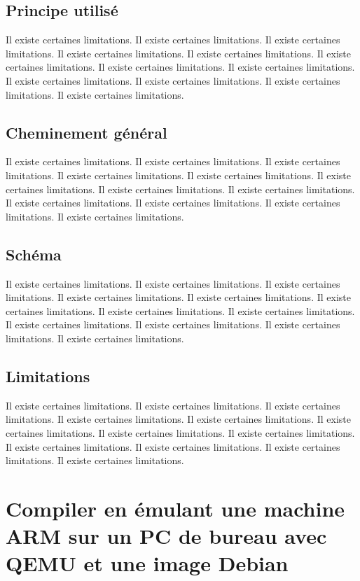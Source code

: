 \documentclass[11pt,a4paper,oneside]{report}
\begin{document}
\subsection{Principe utilisé}

Il existe certaines limitations.
Il existe certaines limitations.
Il existe certaines limitations.
Il existe certaines limitations.
Il existe certaines limitations.
Il existe certaines limitations.
Il existe certaines limitations.
Il existe certaines limitations.
Il existe certaines limitations.
Il existe certaines limitations.
Il existe certaines limitations.
Il existe certaines limitations.
\subsection{Cheminement général}

Il existe certaines limitations.
Il existe certaines limitations.
Il existe certaines limitations.
Il existe certaines limitations.
Il existe certaines limitations.
Il existe certaines limitations.
Il existe certaines limitations.
Il existe certaines limitations.
Il existe certaines limitations.
Il existe certaines limitations.
Il existe certaines limitations.
Il existe certaines limitations.
\subsection{Schéma}

Il existe certaines limitations.
Il existe certaines limitations.
Il existe certaines limitations.
Il existe certaines limitations.
Il existe certaines limitations.
Il existe certaines limitations.
Il existe certaines limitations.
Il existe certaines limitations.
Il existe certaines limitations.
Il existe certaines limitations.
Il existe certaines limitations.
Il existe certaines limitations.
\subsection{Limitations}

Il existe certaines limitations.
Il existe certaines limitations.
Il existe certaines limitations.
Il existe certaines limitations.
Il existe certaines limitations.
Il existe certaines limitations.
Il existe certaines limitations.
Il existe certaines limitations.
Il existe certaines limitations.
Il existe certaines limitations.
Il existe certaines limitations.
Il existe certaines limitations.


\section{Compiler en émulant une machine ARM sur un PC de bureau avec QEMU et une image Debian}
\end{document}
